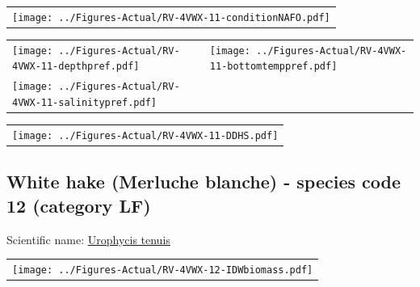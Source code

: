 \documentclass[12pt]{article}\usepackage[]{graphicx}\usepackage[]{color}
\begin{document}
\vspace{1cm}
\begin{minipage}{1.0\textwidth}
 \begin{tabular}{c}
\texttt{[image: ../Figures-Actual/RV-4VWX-11-conditionNAFO.pdf]} \\ 
\end{tabular} 
\end{minipage}
\clearpage
\begin{minipage}{1.0\textwidth}
 \begin{tabular}[t]{m{3in}m{3in}}
\texttt{[image: ../Figures-Actual/RV-4VWX-11-depthpref.pdf]} & 
\texttt{[image: ../Figures-Actual/RV-4VWX-11-bottomtemppref.pdf]} \\ 
\texttt{[image: ../Figures-Actual/RV-4VWX-11-salinitypref.pdf]} & 
 \\ 
\end{tabular} 
\end{minipage}
\newline

\vspace{1cm}
\begin{minipage}{1.0\textwidth}
 \begin{tabular}{c}
\texttt{[image: ../Figures-Actual/RV-4VWX-11-DDHS.pdf]} \\ 
\end{tabular} 
\end{minipage}
\clearpage

\renewcommand\thefigure{\thesubsection\Alph{figure}}

\setcounter{figure}{0}

\hypertarget{sec:12}{%
\subsection{White hake (Merluche blanche) - species code 12 (category LF)}\label{sec:12}}

  


Scientific name: \href{http://www.marinespecies.org/aphia.php?p=taxdetails\&id=126504}{Urophycis tenuis} \newline
\begin{minipage}{1.0\textwidth}
 \begin{tabular}{c}
\texttt{[image: ../Figures-Actual/RV-4VWX-12-IDWbiomass.pdf]} \\ 
\end{tabular} 
\end{minipage}
\newline
\end{document}
